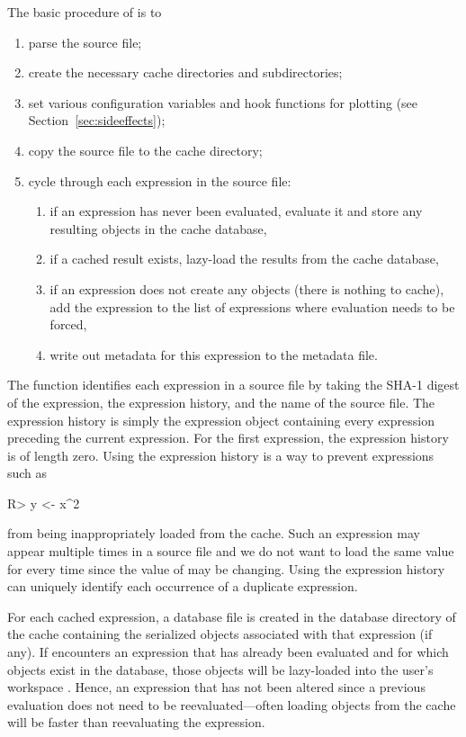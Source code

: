 \documentclass[nojss]{jss}
\begin{document}
The basic procedure of  is to
\begin{enumerate}
\item
parse the  source file;
\item
create the necessary cache directories and subdirectories;
\item
set various configuration variables and hook functions for plotting
(see Section~\ref{sec:sideeffects});
\item
copy the source file to the cache directory;
\item
cycle through each expression in the source file:
\begin{enumerate}
\item
if an expression has never been evaluated, evaluate it and store any
resulting  objects in the cache database,
\item
if a cached result exists, lazy-load the results from the cache database,
\item
if an expression does not create any  objects (there is
nothing to cache), add the expression to the list of expressions where
evaluation needs to be forced,
\item
write out metadata for this expression to the metadata file.
\end{enumerate}
\end{enumerate}

The  function identifies each expression in a source file
by taking the SHA-1 digest of the expression, the expression history,
and the name of the source file.  The expression history is simply the
expression object containing every expression preceding the current
expression.  For the first expression, the expression history is of
length zero.  Using the expression history is a way to prevent
expressions such as
\begin{Schunk}
\begin{Sinput}
R> y <- x^2
\end{Sinput}
\end{Schunk}
from being inappropriately loaded from the cache.  Such an
expression may appear multiple times in a source file and we do not
want to load the same value for  every time since the value of
 may be changing.  Using the expression history can uniquely
identify each occurrence of a duplicate expression.

For each cached expression, a database file is created in the database
directory of the cache containing the serialized  objects
associated with that expression (if any).  If  encounters
an expression that has already been evaluated and for which objects
exist in the database, those objects will be lazy-loaded into the
user's workspace \citep[see e.g.,][]{rnews:ripley:2004}.  Hence, an
expression that has not been altered since a previous evaluation does
not need to be reevaluated---often loading objects from the cache will
be faster than reevaluating the expression.
\end{document}
